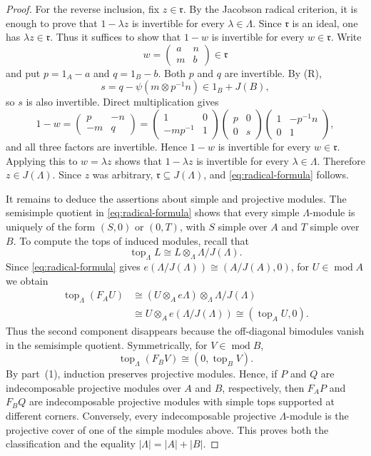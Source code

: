 \documentclass[11pt,reqno]{amsart}
\theoremstyle{definition}
\theoremstyle{remark}
\newcommand{\modu}{\operatorname{mod}}
\numberwithin{equation}{section}
\begin{document}
\begin{proof}
For the reverse inclusion, fix $z\in\mathfrak r$.  By the Jacobson radical
criterion, it is enough to prove that $1-\lambda z$ is invertible for every
$\lambda\in\Lambda$.  Since $\mathfrak r$ is an ideal, one has
$\lambda z\in\mathfrak r$.  Thus it suffices to show that $1-w$ is invertible
for every $w\in\mathfrak r$.  Write
\[
 w=\begin{pmatrix}a&n\\m&b\end{pmatrix}\in\mathfrak r
\]
and put $p=1_A-a$ and $q=1_B-b$.  Both $p$ and $q$ are invertible.  By
\textup{(R)},
\[
 s=q-\psi(m\otimes p^{-1}n)\in1_B+J(B),
\]
so $s$ is also invertible.  Direct multiplication gives
\[
 1-w=\begin{pmatrix}p&-n\\-m&q\end{pmatrix}
 =
 \begin{pmatrix}1&0\\-mp^{-1}&1\end{pmatrix}
 \begin{pmatrix}p&0\\0&s\end{pmatrix}
 \begin{pmatrix}1&-p^{-1}n\\0&1\end{pmatrix},
\]
and all three factors are invertible.  Hence $1-w$ is invertible for every
$w\in\mathfrak r$.  Applying this to $w=\lambda z$ shows that
$1-\lambda z$ is invertible for every $\lambda\in\Lambda$.  Therefore
$z\in J(\Lambda)$.  Since $z$ was arbitrary,
$\mathfrak r\subseteq J(\Lambda)$, and \eqref{eq:radical-formula} follows.

It remains to deduce the assertions about simple and projective modules.
The semisimple quotient in \eqref{eq:radical-formula} shows that every
simple $\Lambda$-module is uniquely of the form $(S,0)$ or $(0,T)$, with
$S$ simple over $A$ and $T$ simple over $B$.  To compute the tops of
induced modules, recall that
\[
 \operatorname{top}_\Lambda L
 \cong L\otimes_\Lambda\Lambda/J(\Lambda).
\]
Since \eqref{eq:radical-formula} gives
$e(\Lambda/J(\Lambda))\cong(A/J(A),0)$, for $U\in\modu A$ we obtain
\[
\begin{aligned}
 \operatorname{top}_\Lambda(F_AU)
 &\cong (U\otimes_Ae\Lambda)\otimes_\Lambda\Lambda/J(\Lambda)\\
 &\cong U\otimes_Ae(\Lambda/J(\Lambda))
 \cong(\operatorname{top}_AU,0).
\end{aligned}
\]
Thus the second component disappears because the off-diagonal bimodules
vanish in the semisimple quotient.  Symmetrically, for $V\in\modu B$,
\[
 \operatorname{top}_\Lambda(F_BV)
 \cong(0,\operatorname{top}_BV).
\]
By part~\textup{(1)}, induction preserves projective
modules.  Hence, if $P$ and $Q$ are indecomposable projective modules over
$A$ and $B$, respectively, then $F_AP$ and $F_BQ$ are indecomposable
projective modules with simple tops supported at different corners.
Conversely, every indecomposable projective $\Lambda$-module is the
projective cover of one of the simple modules above.  This proves both the
classification and the equality $|\Lambda|=|A|+|B|$.
\end{proof}
\end{document}
